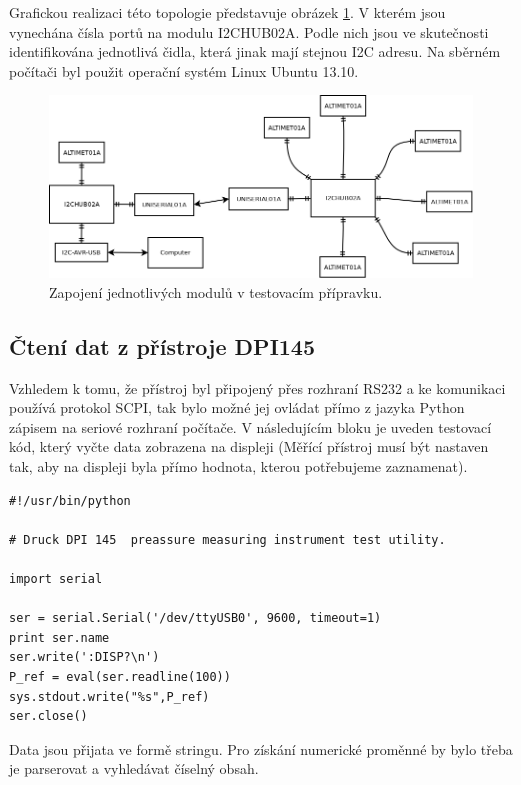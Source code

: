 \documentclass[12pt,a4paper,oneside]{article}
\begin{document}
Grafickou realizaci této topologie představuje obrázek \ref{test_setup_blocks}. V kterém jsou vynechána čísla portů na modulu I2CHUB02A. Podle nich jsou ve skutečnosti identifikována jednotlivá čidla, která jinak mají stejnou I2C adresu. Na sběrném počítači byl použit operační systém Linux Ubuntu 13.10.

\begin{figure} [htbp]
\centering
\includegraphics [width=220mm, angle=90, origin=c] {./img/test_setup.png}
\caption{Zapojení jednotlivých modulů v testovacím přípravku.}
\label{test_setup_blocks}
\end{figure}

\subsection{Čtení dat z přístroje DPI145}

Vzhledem k tomu, že přístroj byl připojený přes rozhraní RS232 a ke komunikaci používá protokol SCPI, tak bylo možné jej ovládat přímo z jazyka Python zápisem na seriové rozhraní počítače. V následujícím bloku je uveden testovací kód, který vyčte data zobrazena na displeji (Měřící přístroj musí být nastaven tak, aby na displeji byla přímo hodnota, kterou potřebujeme zaznamenat).

\begin{lstlisting}[frame=single]
#!/usr/bin/python

# Druck DPI 145  preassure measuring instrument test utility.  

import serial

ser = serial.Serial('/dev/ttyUSB0', 9600, timeout=1)
print ser.name
ser.write(':DISP?\n')
P_ref = eval(ser.readline(100))
sys.stdout.write("%s",P_ref)
ser.close()
\end{lstlisting}

Data jsou přijata ve formě stringu. Pro získání numerické proměnné by bylo třeba je parserovat  a vyhledávat číselný obsah. 
\end{document}
